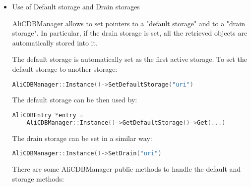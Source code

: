 \documentclass[12pt,a4paper,twoside]{article}
\newcommand{\method}[1]{\texttt{#1}\xspace}
\begin{document}
{\begin{itemize}
\begin{itemize}
    \begin{lstlisting}[language=C++]
      // I want version 2\_1 for all "ZDC/Calib/*" objects for runs 1-100
      sto->AddSelection("ZDC/Calib/*",1,100,2,1);
      // and I want version 1\_0 for "ZDC/Calib/Pedestals" objects for runs 5-10
      sto->AddSelection("ZDC/Calib/Pedestals",5,10,1,0)
      
      AliCDBEntry* entry = sto->Get("ZDC/Calib/Pedestals",5)
    \end{lstlisting}

    See also: \method{AliCDBStorage::RemoveSelection(...),
      RemoveAllSelections(), PrintSelectionList()}

  \item Retrieval of multiple objects with \method{AliCDBStorage::GetAll()}

    \begin{lstlisting}[language=C++]
      TList *list = sto->GetAll("ZDC/*",5)
    \end{lstlisting}
  \end{itemize}

\item Use of Default storage and Drain storages

  AliCDBManager allows to set pointers to a "default storage" and to a 
  "drain storage". In particular, if the drain storage is set, all the 
  retrieved objects are automatically stored into it.

  The default storage is automatically set as the first active storage. To 
  set the default storage to another storage:

  \begin{lstlisting}[language=C++]
    AliCDBManager::Instance()->SetDefaultStorage("uri")
  \end{lstlisting}

  The default storage can be then used by:
  \begin{lstlisting}[language=C++]
    AliCDBEntry *entry =
    AliCDBManager::Instance()->GetDefaultStorage()->Get(...)  
  \end{lstlisting}

  The drain storage can be set in a similar way:

  \begin{lstlisting}[language=C++]
    AliCDBManager::Instance()->SetDrain("uri")
  \end{lstlisting}

  There are some AliCDBManager public methods to handle the default and 
  storage methods:


\end{itemize}}
\end{document}
